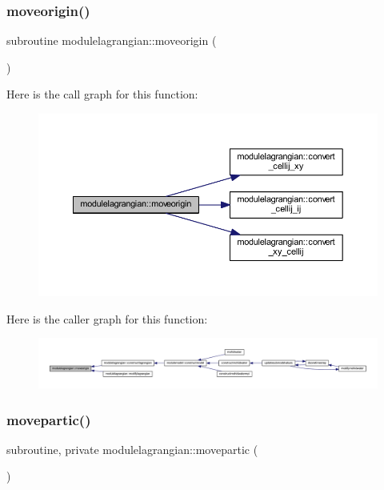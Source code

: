 \subsubsection{\texorpdfstring{moveorigin()}{moveorigin()}}
{\footnotesize\ttfamily subroutine modulelagrangian\+::moveorigin (\begin{DoxyParamCaption}{ }\end{DoxyParamCaption})\hspace{0.3cm}{\ttfamily [private]}}

Here is the call graph for this function\+:\nopagebreak
\begin{figure}[H]
\begin{center}
\leavevmode
\includegraphics[width=350pt]{namespacemodulelagrangian_a56e2a0655f742104a77b7d6d4040508f_cgraph}
\end{center}
\end{figure}
Here is the caller graph for this function\+:\nopagebreak
\begin{figure}[H]
\begin{center}
\leavevmode
\includegraphics[width=350pt]{namespacemodulelagrangian_a56e2a0655f742104a77b7d6d4040508f_icgraph}
\end{center}
\end{figure}
\mbox{\label{namespacemodulelagrangian_ad9212277994fb1a55e17c7e17d66aabc}} 
\subsubsection{\texorpdfstring{movepartic()}{movepartic()}}
{\footnotesize\ttfamily subroutine, private modulelagrangian\+::movepartic (\begin{DoxyParamCaption}{ }\end{DoxyParamCaption})\hspace{0.3cm}{\ttfamily [private]}}

